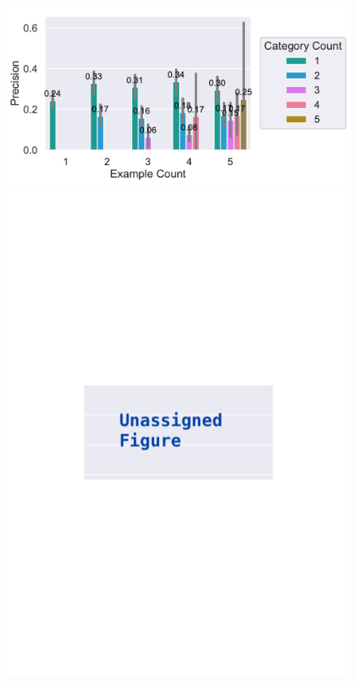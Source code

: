 \documentclass[\myrootdir/main.tex]{subfiles}
\begin{document}
\begin{figure}[htbp]
	\centering
	\begin{minipage}{0.45\textwidth}
		\centering
		\includegraphics[width=\textwidth, clip]{img/big-study/precision-categorycount-examplecount-all.pdf}
		\caption{}
		\label{fig:precision-categorycount-examplecount-all}
	\end{minipage}\hfill
	\begin{minipage}{0.45\textwidth}
		\centering
		\includegraphics[width=\textwidth, clip]{img/big-study/xxx.pdf}
		\caption{}
		\label{fig:xxx}
	\end{minipage}
\end{figure}
\end{document}
